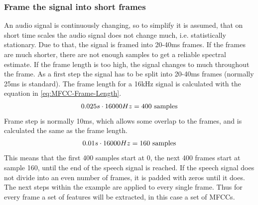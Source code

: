 \subsubsection{Frame the signal into short frames}
An audio signal is continuously changing, so to simplify it is assumed, that on short time scales the audio signal does not change much, i.e. statistically stationary. Due to that, the signal is framed into 20-40ms frames. If the frames are much shorter, there are not enough samples to get a reliable spectral estimate. If the frame length is too high, the signal changes to much throughout the frame.
\newline 
\newline
As a first step the signal has to be split into 20-40ms frames (normally 25ms is standard). The frame length for a 16kHz signal is calculated with the equation in \ref{eq:MFCC-Frame-Length}. 
\begin{equation}
    \centering
    0.025s \cdot 16000Hz = 400 \ \text{samples}
    \label{eq:MFCC-Frame-Length}
\end{equation}
Frame step is normally 10ms, which allows some overlap to the frames, and is calculated the same as the frame length.
\begin{equation}
    \centering
    0.01s \cdot 16000Hz = 160 \ \text{samples}
    \label{eq:MFCC-Frame-Step}
\end{equation}
This means that the first 400 samples start at 0, the next 400 frames start at sample 160, until the end of the speech signal is reached. If the speech signal does not divide into an even number of frames, it is padded with zeros until it does. The next steps within the example are applied to every single frame. Thus for every frame a set of features will be extracted, in this case a set of \glspl{MFCC}.

